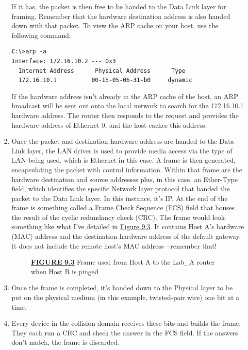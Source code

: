 \begin{enumerate}
  If it has, the packet is then free to be handed to the Data Link layer
  for framing. Remember that the hardware destination address is also
  handed down with that packet. To view the ARP cache on your host, use
  the following command:

\begin{verbatim}
C:\>arp -a
Interface: 172.16.10.2 --- 0x3
  Internet Address      Physical Address      Type
  172.16.10.1          00-15-05-06-31-b0     dynamic
\end{verbatim}

  If the hardware address isn't already in the ARP cache of the host, an
  ARP broadcast will be sent out onto the local network to search for
  the 172.16.10.1 hardware address. The router then responds to the
  request and provides the hardware address of Ethernet 0, and the host
  caches this address.
\item
  Once the packet and destination hardware address are handed to the
  Data Link layer, the LAN driver is used to provide media access via
  the type of LAN being used, which
  \protect\hypertarget{c09.xhtmlux5cux23Page_363}{}{}is Ethernet in this
  case. A frame is then generated, encapsulating the packet with control
  information. Within that frame are the hardware destination and source
  addresses plus, in this case, an Ether-Type field, which identifies
  the specific Network layer protocol that handed the packet to the Data
  Link layer. In this instance, it's IP. At the end of the frame is
  something called a Frame Check Sequence (FCS) field that houses the
  result of the cyclic redundancy check (CRC). The frame would look
  something like what I've detailed in
  \protect\hyperlink{c09.xhtmlux5cux23figure9-3}{Figure 9.3}. It
  contains Host A's hardware (MAC) address and the destination hardware
  address of the default gateway. It does not include the remote host's
  MAC address---remember that!

  \begin{figure}
  \centering
  \caption{{\protect\hyperlink{c09.xhtmlux5cux23figureanchor9-3}{\textbf{FIGURE
  9.3}} Frame used from Host A to the Lab\_A router when Host B is
  pinged}}
  \end{figure}
\item
  Once the frame is completed, it's handed down to the Physical layer to
  be put on the physical medium (in this example, twisted-pair wire) one
  bit at a time.
\item
  Every device in the collision domain receives these bits and builds
  the frame. They each run a CRC and check the answer in the FCS field.
  If the answers don't match, the frame is discarded.


\end{enumerate}
